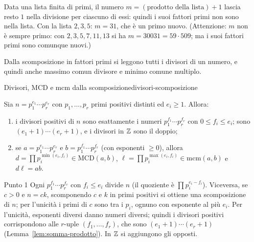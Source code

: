 \begin{spiegazione}
    Data una lista finita di primi, il numero $m = (\text{prodotto della lista}) + 1$ lascia resto $1$ nella divisione per ciascuno di essi:
    quindi i suoi fattori primi non sono nella lista. Con la lista $2, 3, 5$: $m = 31$, che è un primo nuovo. (Attenzione: $m$ non è sempre
    primo: con $2, 3, 5, 7, 11, 13$ si ha $m = 30031 = 59 \cdot 509$; ma i suoi fattori primi sono comunque nuovi.)
\end{spiegazione}

Dalla scomposizione in fattori primi si leggono tutti i divisori di un numero, e quindi anche massimo comun divisore e minimo
comune multiplo.

\begin{concetto}
\begin{Proposizione}{Divisori, MCD e mcm dalla scomposizione}{divisori-scomposizione}
    \begin{prerequisiti}
    \end{prerequisiti}
    Sia $n = p_1^{e_1} \cdots p_r^{e_r}$ con $p_1, \dots, p_r$ primi positivi distinti ed $e_i \geq 1$. Allora:
    \begin{enumerate}
        \item i divisori positivi di $n$ sono esattamente i numeri $p_1^{f_1} \cdots p_r^{f_r}$ con $0 \leq f_i \leq e_i$; sono $(e_1 + 1) \cdots (e_r + 1)$, e
              i divisori in $\mathbb{Z}$ sono il doppio;
        \item se $a = p_1^{e_1} \cdots p_r^{e_r}$ e $b = p_1^{f_1} \cdots p_r^{f_r}$ (con esponenti $\geq 0$), allora
              $d = \prod p_i^{\min(e_i, f_i)} \in \mathrm{MCD}(a, b)$, $\ell = \prod p_i^{\max(e_i, f_i)} \in \mathrm{mcm}(a, b)$ e $d\ell = ab$.
    \end{enumerate}
\end{Proposizione}
\begin{dimostrazione}
    \begin{caso}{Punto 1}
        Ogni $p_1^{f_1} \cdots p_r^{f_r}$ con $f_i \leq e_i$ divide $n$ (il quoziente è $\prod p_i^{e_i - f_i}$). Viceversa, se $c > 0$ e $n = ck$, scomponendo
        $c$ e $k$ in primi positivi si ottiene una scomposizione di $n$; per l'unicità i primi di $c$ sono tra i $p_i$, ognuno con esponente
        al più $e_i$. Per l'unicità, esponenti diversi danno numeri diversi; quindi i divisori positivi corrispondono alle $r$-uple
        $(f_1, \dots, f_r)$, che sono $(e_1 + 1) \cdots (e_r + 1)$ (Lemma~\ref{lem:somma-prodotto}). In $\mathbb{Z}$ si aggiungono gli opposti.

\end{caso}
\end{dimostrazione}
\end{concetto}

